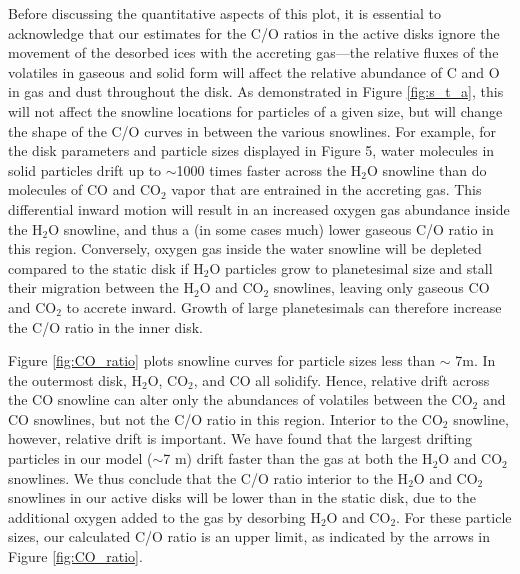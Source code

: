 \documentclass[apj]{emulateapj}
\begin{document}
Before discussing the quantitative aspects of this plot, it is essential to acknowledge that our estimates for the C/O ratios in the active disks ignore the movement of the desorbed ices with the accreting gas---the relative fluxes of the volatiles in gaseous and solid form will affect the relative abundance of C and O in gas and dust throughout the disk. As demonstrated in Figure \ref{fig:s_t_a}, this will not affect the snowline locations for particles of a given size, but will change the shape of the C/O curves in between the various snowlines. For example, for the disk parameters and particle sizes displayed in Figure 5, water molecules in solid particles drift up to $\sim$1000 times faster across the H$_2$O snowline than do molecules of CO and CO$_2$ vapor that are entrained in the accreting gas.  This differential inward motion will result in an increased oxygen gas abundance inside the H$_2$O snowline, and thus a (in some cases much) lower gaseous C/O ratio in this region. Conversely, oxygen gas inside the water snowline will be depleted compared to the static disk if H$_2$O particles grow to planetesimal size and stall their migration between the H$_2$O and CO$_2$ snowlines, leaving only gaseous CO and CO$_2$ to accrete inward.  Growth of large planetesimals can therefore increase the C/O ratio in the inner disk.

Figure \ref{fig:CO_ratio} plots snowline curves for particle sizes less than $\sim$ 7m.  In the outermost disk, H$_2$O, CO$_2$, and CO all solidify.  Hence, relative drift across the CO snowline can alter only the abundances of volatiles between the CO$_2$ and CO snowlines, but not the C/O ratio in this region.  Interior to the CO$_2$ snowline, however, relative drift is important. 
We have found that the largest drifting particles in our model ($\sim$7 m) drift faster than the gas at both the H$_2$O and CO$_2$ snowlines. We thus conclude that the C/O ratio interior to the H$_2$O and CO$_2$ snowlines in our active disks will be lower than in the static disk, due to the additional oxygen added to the gas by desorbing H$_2$O and CO$_2$.  For these particle sizes, our calculated C/O ratio is an upper limit,  as indicated by the arrows in Figure \ref{fig:CO_ratio}.


\end{document}
